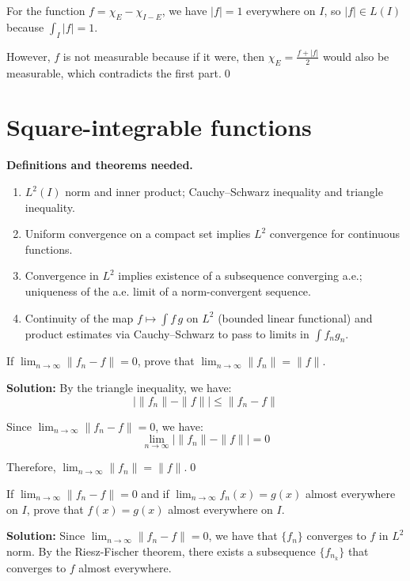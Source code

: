 For the function $f = \chi_E - \chi_{I-E}$, we have $|f| = 1$ everywhere on $I$, so $|f| \in L(I)$ because $\int_I |f| = 1$.

However, $f$ is not measurable because if it were, then $\chi_E = \frac{f + |f|}{2}$ would also be measurable, which contradicts the first part.\qed
\section{Square-integrable functions}

\noindent\textbf{Definitions and theorems needed.}
\begin{enumerate}[label=(\alph*)]
    \item $L^2(I)$ norm and inner product; Cauchy–Schwarz inequality and triangle inequality.
    \item Uniform convergence on a compact set implies $L^2$ convergence for continuous functions.
    \item Convergence in $L^2$ implies existence of a subsequence converging a.e.; uniqueness of the a.e. limit of a norm-convergent sequence.
    \item Continuity of the map $f\mapsto \int f\,g$ on $L^2$ (bounded linear functional) and product estimates via Cauchy–Schwarz to pass to limits in $\int f_ng_n$.
\end{enumerate}



\begin{problembox}
If $\lim_{n \to \infty} \| f_n - f \| = 0$, prove that $\lim_{n \to \infty} \| f_n \| = \| f \|$.
\end{problembox}

\noindent\textbf{Solution:}
By the triangle inequality, we have:
\[|\| f_n \| - \| f \|| \leq \| f_n - f \|\]

Since $\lim_{n \to \infty} \| f_n - f \| = 0$, we have:
\[\lim_{n \to \infty} |\| f_n \| - \| f \|| = 0\]

Therefore, $\lim_{n \to \infty} \| f_n \| = \| f \|$.\qed


\begin{problembox}
If $\lim_{n \to \infty} \| f_n - f \| = 0$ and if $\lim_{n \to \infty} f_n(x) = g(x)$ almost everywhere on $I$, prove that $f(x) = g(x)$ almost everywhere on $I$.
\end{problembox}

\noindent\textbf{Solution:}
Since $\lim_{n \to \infty} \| f_n - f \| = 0$, we have that $\{f_n\}$ converges to $f$ in $L^2$ norm. By the Riesz-Fischer theorem, there exists a subsequence $\{f_{n_k}\}$ that converges to $f$ almost everywhere.

